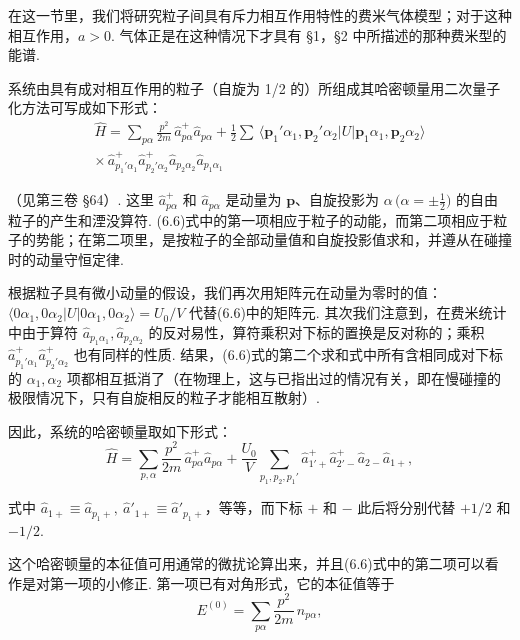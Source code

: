 在这一节里，我们将研究粒子间具有斥力相互作用特性的费米气体模型；对于这种相互作用，$a>0$. 气体正是在这种情况下才具有 §1，§2 中所描述的那种费米型的能谱.

系统由具有成对相互作用的粒子（自旋为 1/2 的）所组成其哈密顿量用二次量子化方法可写成如下形式：
\begin{equation}
\begin{split}
\hat H=\sum_{p\alpha}\frac{p^{2}}{2m}\,\hat a^{+}_{p\alpha}\hat a_{p\alpha}
+\frac{1}{2}\sum\,\langle\bm p_{1}'\alpha_{1},\bm p_{2}'\alpha_{2}|U|\bm p_{1}\alpha_{1},\bm p_{2}\alpha_{2}\rangle\\
\times\,\hat a^{+}_{p_{1}'\alpha_{1}}\hat a^{+}_{p_{2}'\alpha_{2}}\hat a_{p_{2}\alpha_{2}}\hat a_{p_{1}\alpha_{1}}
\end{split}
\end{equation}

（见第三卷 §64）. 这里 $\hat a^{+}_{p\alpha}$ 和 $\hat a_{p\alpha}$ 是动量为 $\bm p$、自旋投影为 $\alpha\,\bigl(\alpha=\pm\frac{1}{2}\bigr)$ 的自由粒子的产生和湮没算符. (6.6)式中的第一项相应于粒子的动能，而第二项相应于粒子的势能；在第二项里，是按粒子的全部动量值和自旋投影值求和，并遵从在碰撞时的动量守恒定律.

根据粒子具有微小动量的假设，我们再次用矩阵元在动量为零时的值：$\langle0\alpha_{1},0\alpha_{2}|U|0\alpha_{1},0\alpha_{2}\rangle=U_{0}/V$ 代替(6.6)中的矩阵元. 其次我们注意到，在费米统计中由于算符 $\hat a_{p_{1}\alpha_{1}},\hat a_{p_{2}\alpha_{2}}$ 的反对易性，算符乘积对下标的置换是反对称的；乘积 $\hat a^{+}_{p_{1}'\alpha_{1}}\hat a^{+}_{p_{2}'\alpha_{2}}$ 也有同样的性质. 结果，(6.6)式的第二个求和式中所有含相同成对下标的 $\alpha_{1},\alpha_{2}$ 项都相互抵消了（在物理上，这与已指出过的情况有关，即在慢碰撞的极限情况下，只有自旋相反的粒子才能相互散射）.

因此，系统的哈密顿量取如下形式：
\begin{equation}
\hat H=\sum_{p,\alpha}\frac{p^{2}}{2m}\,\hat a^{+}_{p\alpha}\hat a_{p\alpha}
+\frac{U_{0}}{V}\sum_{p_{1},p_{2},p_{1}'}\hat a^{+}_{1'+}\hat a^{+}_{2'-}\hat a_{2-}\hat a_{1+},
\end{equation}

式中 $\hat a_{1+}\equiv\hat a_{p_{1}+},\ \hat a'_{1+}\equiv\hat a'_{p_{1}+}$，等等，而下标 $+$ 和 $-$ 此后将分别代替 $+1/2$ 和 $-1/2$.

这个哈密顿量的本征值可用通常的微扰论算出来，并且(6.6)式中的第二项可以看作是对第一项的小修正. 第一项已有对角形式，它的本征值等于
\begin{equation}
E^{(0)}=\sum_{p\alpha}\frac{p^{2}}{2m}\,n_{p\alpha},
\end{equation}

